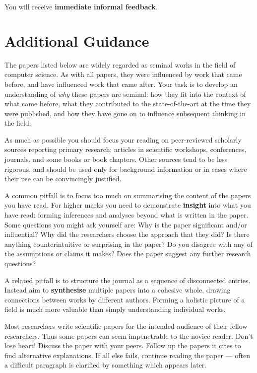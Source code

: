 \documentclass{../../fal_assignment}
\begin{document}
You will receive \textbf{immediate informal feedback}.

\section*{Additional Guidance}

The papers listed below are widely regarded as seminal works in the field of computer science.
As with all papers, they were influenced by work that came before,
and have influenced work that came after.
Your task is to develop an understanding of \textit{why} these papers are seminal:
how they fit into the context of what came before,
what they contributed to the state-of-the-art at the time they were published,
and how they have gone on to influence subsequent thinking in the field.

As much as possible you should focus your reading on peer-reviewed scholarly sources reporting primary research:
articles in scientific workshops, conferences, journals, and some books or book chapters.
Other sources tend to be less rigorous, and should be used only for background information
or in cases where their use can be convincingly justified.

A common pitfall is to focus too much on summarising the content of the papers you have read.
For higher marks you need to demonstrate \textbf{insight} into what you have read:
forming inferences and analyses beyond what is written in the paper.
Some questions you might ask yourself are:
Why is the paper significant and/or influential?
Why did the researchers choose the approach that they did?
Is there anything counterintuitive or surprising in the paper?
Do you disagree with any of the assumptions or claims it makes?
Does the paper suggest any further research questions?

A related pitfall is to structure the journal as a sequence of disconnected entries.
Instead aim to \textbf{synthesise} multiple papers into a cohesive whole,
drawing connections between works by different authors.
Forming a holistic picture of a field is much more valuable than simply understanding individual works.

Most researchers write scientific papers for the intended audience of their fellow researchers.
Thus some papers can seem impenetrable to the novice reader.
Don't lose heart!
Discuss the paper with your peers.
Follow up the papers it cites to find alternative explanations.
If all else fails, continue reading the paper --- often a difficult paragraph is clarified by something which appears later.
\end{document}
